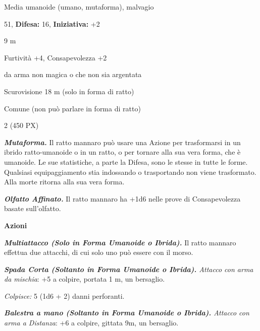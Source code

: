\begin{multicols}{2}
{
\noindent
\begin{description}[noitemsep, topsep=0pt, parsep=0pt, partopsep=0pt, leftmargin=0cm, labelwidth=2.2cm]
	\item[\textbf{Taglia/Tipo:}] Media umanoide (umano, mutaforma), malvagio
	\item[\textbf{Caratt.:}] 
	\item[\textbf{Punti Ferita:}] 51,  \textbf{Difesa:} 16,  \textbf{Iniziativa:} +2
	\item[\textbf{Movimento:}] 9 m
	\item[\textbf{Tiri Salvez.:}] 
	\item[\textbf{Comp.:}] Furtività +4, Consapevolezza +2
	\item[\textbf{Imm. Danni:}] da arma non magica o che non sia argentata
	\item[\textbf{Sensi:}] Scurovisione 18 m (solo in forma di ratto)
	\item[\textbf{Linguaggi:}] Comune (non può parlare in forma di ratto)
	\item[\textbf{Sfida:}] 2 (450 PX)\smallskip
\end{description}

\emph{\textbf{Mutaforma.}} Il ratto mannaro può usare una Azione per trasformarsi in un ibrido ratto-umanoide o in un ratto, o per tornare alla sua vera forma, che è umanoide. Le sue statistiche, a parte la Difesa, sono le stesse in tutte le forme. Qualsiasi equipaggiamento stia indossando o trasportando non viene trasformato. Alla morte ritorna alla sua vera forma.

\emph{\textbf{Olfatto Affinato.}} Il ratto mannaro ha +1d6 nelle prove di Consapevolezza basate sull'olfatto.

\textbf{Azioni}

\emph{\textbf{Multiattacco (Solo in Forma Umanoide o Ibrida).}} Il ratto mannaro effettua due attacchi, di cui solo uno può essere con il morso.

\emph{\textbf{Spada Corta (Soltanto in Forma Umanoide o Ibrida).} Attacco con arma da mischia}: +5 a colpire, portata 1 m, un bersaglio.

\emph{Colpisce:} 5 (1d6 + 2) danni perforanti.

\emph{\textbf{Balestra a mano (Soltanto in Forma Umanoide o Ibrida).} Attacco con arma a Distanza}: +6 a colpire, gittata 9m, un bersaglio.

}
\end{multicols}
